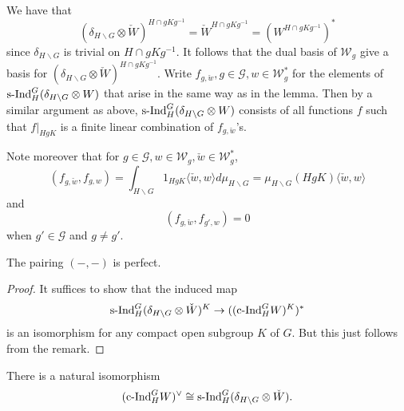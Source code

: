 \documentclass{memoir}
\begin{document}
\begin{remark}
    We have that 
    \begin{equation}
        (\delta_{H\backslash G}\otimes \check W)^{H\cap gKg^{-1}} = \check W^{H\cap gKg^{-1}} = \left(W^{H\cap gKg^{-1}}\right)^*
    \end{equation}
    since $\delta_{H\backslash G}$ is trivial on $H\cap gKg^{-1}$.
    It follows that the dual basis of $\mathcal W_g$ give a basis for $(\delta_{H\backslash G}\otimes \check W)^{H\cap gKg^{-1}}$.
    Write $f_{g,\check w}, g\in \mathcal G, w\in \mathcal W_g^*$ for the elements of $\text{s-Ind}_H^G(\delta_{H\backslash G}\otimes W)$ that arise in the same way as in the lemma.
    Then by a similar argument as above, $\text{s-Ind}_H^G(\delta_{H\backslash G}\otimes W)$ consists of all functions $f$ such that $f|_{HgK}$ is a finite linear combination of $f_{g,\check w}$'s.

    Note moreover that for $g\in \mathcal G, w\in \mathcal W_g,\check w\in \mathcal W_g^*$,
    \begin{equation}
        (f_{g,\check w},f_{g,w}) = \int_{H\backslash G}1_{HgK}\langle\check w,w\rangle d\mu_{H\backslash G} = \mu_{H\backslash G}(HgK)\langle \check w, w \rangle
    \end{equation}
    and 
    \begin{equation}
        (f_{g,\check w},f_{g',w}) = 0
    \end{equation}
    when $g'\in\mathcal G$ and $g\ne g'$.
\end{remark}
\begin{proposition}
    The pairing $(-,-)$ is perfect.
\end{proposition}
\begin{proof}
    It suffices to show that the induced map 
    \begin{equation}
        \text{s-Ind}_H^G(\delta_{H\backslash G}\otimes \check W)^K\to ((\text{c-Ind}_H^GW)^K)^*
    \end{equation}
    is an isomorphism for any compact open subgroup $K$ of $G$.
    But this just follows from the remark.
\end{proof}
\begin{corollary}
    There is a natural isomorphism
    \begin{equation}
        (\text{c-Ind}_H^GW)^\vee \cong \text{s-Ind}_H^G(\delta_{H\backslash G}\otimes \check W).
    \end{equation}
\end{corollary}
\end{document}
